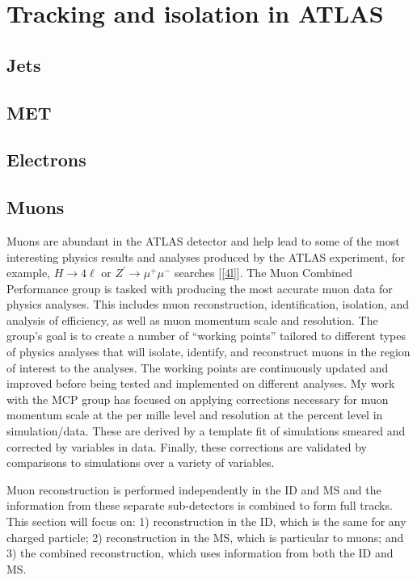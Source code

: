 \section{Tracking and isolation in ATLAS}
\subsection{Jets}
\subsection{MET}
\subsection{Electrons}
\subsection{Muons}
Muons are abundant in the ATLAS detector and help lead to some of the most interesting physics results and analyses produced by the ATLAS experiment, for example, $H \rightarrow 4\ell$ or $Z^\prime \rightarrow \mu^+\mu^-$ searches [\ref{4l}]. The Muon Combined Performance group is tasked with producing the most accurate muon data for physics analyses. This includes muon reconstruction, identification, isolation, and analysis of efficiency, as well as muon momentum scale and resolution. The group's goal is to create a number of ``working points'' tailored to different types of physics analyses that will isolate, identify, and reconstruct muons in the region of interest to the analyses. The working points are continuously updated and improved before being tested and implemented on different analyses. My work with the MCP group has focused on applying corrections necessary for muon momentum scale at the per mille level and resolution at the percent level in simulation/data. These are derived by a template fit of simulations smeared and corrected by variables in data. Finally, these corrections are validated by comparisons to simulations over a variety of variables. 

Muon reconstruction is performed independently in the ID and MS and the information from these separate sub-detectors is combined to form full tracks. This section will focus on: 1) reconstruction in the ID, which is the same for any charged particle; 2) reconstruction in the MS, which is particular to muons; and 3) the combined reconstruction, which uses information from both the ID and MS. 

